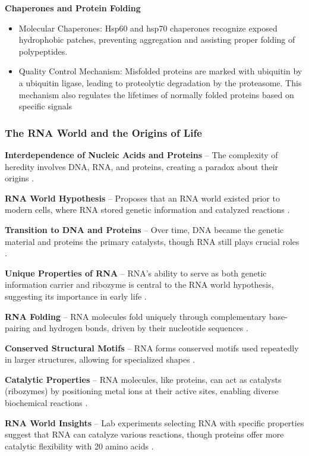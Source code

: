 \textbf{Chaperones and Protein Folding}
\begin{itemize}
    \item Molecular Chaperones: Hsp60 and hsp70 chaperones recognize exposed hydrophobic patches, preventing aggregation and assisting proper folding of polypeptides.
    \item Quality Control Mechanism: Misfolded proteins are marked with ubiquitin by a ubiquitin ligase, leading to proteolytic degradation by the proteasome. This mechanism also regulates the lifetimes of normally folded proteins based on specific signals
\end{itemize}

\subsubsection{The RNA World and the Origins of Life}
\textbf{Interdependence of Nucleic Acids and Proteins} – The complexity of heredity involves DNA, RNA, and proteins, creating a paradox about their origins \cite*{L1-Chapter6}.

\textbf{RNA World Hypothesis} – Proposes that an RNA world existed prior to modern cells, where RNA stored genetic information and catalyzed reactions \cite*{L1-Chapter6}.

\textbf{Transition to DNA and Proteins} – Over time, DNA became the genetic material and proteins the primary catalysts, though RNA still plays crucial roles \cite*{L1-Chapter6}.

\textbf{Unique Properties of RNA} – RNA’s ability to serve as both genetic information carrier and ribozyme is central to the RNA world hypothesis, suggesting its importance in early life \cite*{L1-Chapter6}.


\textbf{RNA Folding} – RNA molecules fold uniquely through complementary base-pairing and hydrogen bonds, driven by their nucleotide sequences \cite*{L1-Chapter6}.

\textbf{Conserved Structural Motifs} – RNA forms conserved motifs used repeatedly in larger structures, allowing for specialized shapes \cite*{L1-Chapter6}.

\textbf{Catalytic Properties} – RNA molecules, like proteins, can act as catalysts (ribozymes) by positioning metal ions at their active sites, enabling diverse biochemical reactions \cite*{L1-Chapter6}.

\textbf{RNA World Insights} – Lab experiments selecting RNA with specific properties suggest that RNA can catalyze various reactions, though proteins offer more catalytic flexibility with 20 amino acids \cite*{L1-Chapter6}.


